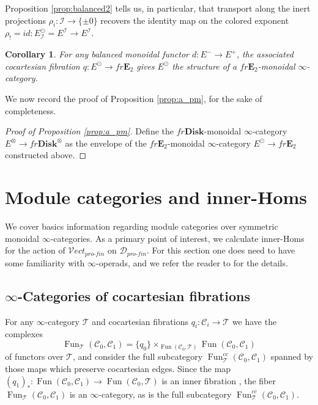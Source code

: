\documentclass[reqno]{amsart}
\newtheorem{corollary}[lemma]{Corollary}
\theoremstyle{definition}
\newcommand{\mcl}[1]{\mathcal{#1}}
\newcommand{\msc}[1]{\mathscr{#1}}
\newcommand{\ot}{\otimes}
\newcommand{\Vect}{\msc{V}\!ect}
\newcommand{\E}{\mathbf{E}}
\newcommand{\Disk}{\mathbf{Disk}}
\newcommand{\pf}{pro\text{-}fin}
\DeclareMathOperator{\Fun}{Fun}
\renewcommand{\1}{\mathbf{1}}
\begin{document}
Proposition \ref{prop:balanced2} tells us, in particular, that transport along the inert projections $\rho_i:\mcl{I}\to \{\pm 0\}$ recovers the identity map on the colored exponent $\rho_!=id:E^{\odot}_{\mcl{I}}=E^{\mcl{I}}\to E^{\mcl{I}}$.

\begin{corollary}\label{cor:balanced3}
For any balanced monoidal functor $d:E^-\to E^+$, the associated cocartesian fibration $q:E^{\odot}\to fr\E_2$ gives $E^{\odot}$ the structure of a $fr\E_2$-monoidal $\infty$-category.
\end{corollary}

We now record the proof of Proposition \ref{prop:a_pm}, for the sake of completeness.

\begin{proof}[Proof of Proposition \ref{prop:a_pm}]
Define the $fr\Disk$-monoidal $\infty$-category $E^{\ot}\to fr\Disk^{\ot}$ as the envelope of the $fr\E_2$-monoidal $\infty$-category $E^{\odot}\to fr\E_2$ constructed above.
\end{proof}

\section{Module categories and inner-Homs}
\label{sect:module_cats}

We cover basics information regarding module categories over symmetric monoidal $\infty$-categories.  As a primary point of interest, we calculate inner-Homs for the action of $\Vect_{\pf}$ on $\msc{D}_{\pf}$. For this section one does need to have some familiarity with $\infty$-operads, and we refer the reader to \cite[Sections 2.1.1 and 2.1.2]{ha} for the details.

\subsection{$\infty$-Categories of cocartesian fibrations}
\label{sect:cocart_sm}

For any $\infty$-category $\msc{T}$ and cocartesian fibrations $q_i:\msc{C}_i\to \msc{T}$ we have the complexes
\[
\Fun_{\msc{T}}(\msc{C}_0,\msc{C}_1)=\{q_0\}\times_{\Fun(\msc{C}_0,\msc{T})}\Fun(\msc{C}_0,\msc{C}_1)
\]
of functors over $\msc{T}$, and consider the full subcategory $\Fun_{\msc{T}}^{cc}(\msc{C}_0,\msc{C}_1)$ spanned by those maps which preserve cocartesian edges.  Since the map $(q_1)_{\ast}:\Fun(\msc{C}_0,\msc{C}_1)\to \Fun(\msc{C}_0,\msc{T})$ is an inner fibration \cite[\href{https://kerodon.net/tag/01BV}{01BV}]{kerodon}, the fiber $\Fun_{\msc{T}}(\msc{C}_0,\msc{C}_1)$ is an $\infty$-category, as is the full subcategory $\Fun_{\msc{T}}^{cc}(\msc{C}_0,\msc{C}_1)$.
\par
\end{document}
